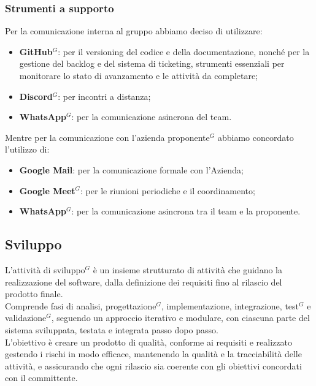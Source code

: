 	\subsubsection{Strumenti a supporto}
	\label{sec:strumenti-supporto}
	Per la comunicazione interna al gruppo abbiamo deciso di utilizzare: \vspace{-0.5em}
	\begin{itemize}[itemsep=3pt, parsep=1pt, label=$\scriptstyle\bullet$]
		\item \textbf{GitHub$^G$}: per il versioning del codice e della documentazione, nonché per la gestione del backlog e del sistema di ticketing, strumenti essenziali per monitorare lo stato di avanzamento e le attività da completare;
	    \item \textbf{Discord$^G$}: per incontri a distanza;
	    \item \textbf{WhatsApp$^G$}: per la comunicazione asincrona del team.
	\end{itemize}
	Mentre per la comunicazione con l'azienda proponente$^G$ abbiamo concordato l'utilizzo di: \vspace{-0.5em}
	\begin{itemize}[itemsep=3pt, parsep=1pt, label=$\scriptstyle\bullet$]
	    \item \textbf{Google Mail}: per la comunicazione formale con l'Azienda;
	    \item \textbf{Google Meet$^G$}: per le riunioni periodiche e il coordinamento;
	    \item \textbf{WhatsApp$^G$}: per la comunicazione asincrona tra il team e la proponente.
	\end{itemize}
	
	\subsection{Sviluppo}
	L'attività di sviluppo$^G$ è un insieme strutturato di attività che guidano la realizzazione del software, dalla definizione dei requisiti fino al rilascio del prodotto finale.\\ 
	Comprende fasi di analisi, progettazione$^G$, implementazione, integrazione, test$^G$ e validazione$^G$, seguendo un approccio iterativo e modulare, con ciascuna parte del sistema sviluppata, testata e integrata passo dopo passo.\\
	L'obiettivo è creare un prodotto di qualità, conforme ai requisiti e realizzato gestendo i rischi in modo efficace, mantenendo la qualità e la tracciabilità delle attività, e assicurando che ogni rilascio sia coerente con gli obiettivi concordati con il committente.
	
